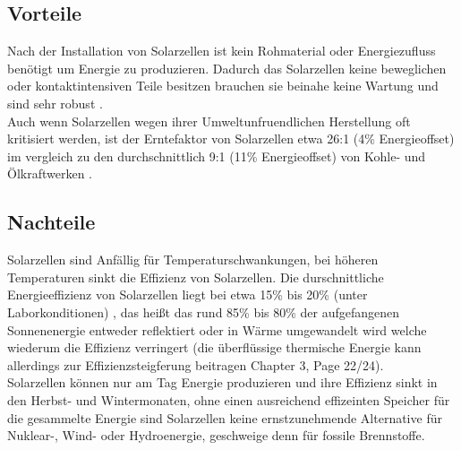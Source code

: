 \subsection{Vorteile}
    Nach der Installation von Solarzellen ist kein Rohmaterial oder
    Energiezufluss benötigt um Energie zu produzieren. Dadurch das
    Solarzellen keine beweglichen oder kontaktintensiven Teile besitzen
    brauchen sie beinahe keine Wartung und sind sehr robust
    \cite{SolarMaintenance}.\\
    Auch wenn Solarzellen wegen ihrer Umweltunfruendlichen Herstellung oft
    kritisiert werden, ist der Erntefaktor von Solarzellen etwa 26:1 (4\%
    Energieoffset) im vergleich zu den durchschnittlich 9:1 (11\%
    Energieoffset) von Kohle- und Ölkraftwerken \cite{SolarCarbonEmissions}.

\subsection{Nachteile}
    Solarzellen sind Anfällig für Temperaturschwankungen, bei höheren
    Temperaturen sinkt die Effizienz von Solarzellen. Die durschnittliche
    Energieeffizienz von Solarzellen liegt bei etwa 15\% bis 20\% (unter
    Laborkonditionen) \cite{SolarEfficiency}, das heißt das rund 85\% bis 80\%
    der aufgefangenen Sonnenenergie entweder reflektiert oder in Wärme
    umgewandelt wird welche wiederum die Effizienz verringert (die überflüssige
    thermische Energie kann allerdings zur Effizienzsteigferung beitragen
    \cite{PhotovoltaicPrinciples} Chapter 3, Page 22/24).\\
    Solarzellen können nur am Tag Energie produzieren und ihre Effizienz
    sinkt in den Herbst- und Wintermonaten, ohne einen ausreichend effizeinten
    Speicher für die gesammelte Energie sind Solarzellen keine ernstzunehmende
    Alternative für Nuklear-, Wind- oder Hydroenergie, geschweige denn für
    fossile Brennstoffe.